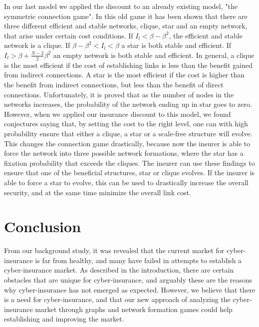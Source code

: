 In our last model we applied the discount to an already existing model, "the symmetric connection game". In this old game it has been shown that there are three different efficient and stable networks, clique, star and an empty network, that arise under certain cost conditions. If $I_{l}<\beta-\beta^{2}$, the efficient and stable network is a clique. If $\beta-\beta^{2}<I_{l}<\beta$ a star is both stable and efficient. If $I_{l}>\beta+\frac{N-2}{2}\beta^{2}$ an empty network is both stable and efficient. In general, a clique is the most efficient if the cost of establishing links is less than the benefit gained from indirect connections. A star is the most efficient if the cost is higher than the benefit from indirect connections, but less than the benefit of direct connections. 
Unfortunately, it is proved that as the number of nodes in the networks increases, the probability of the network ending up in star goes to zero. However, when we applied our insurance discount to this model, we found conjectures saying that, by setting the cost to the right level, one can with high probability ensure that either a clique, a star or a scale-free structure will evolve. This changes the connection game drastically, because now the insurer is able to force the network into three possible network formations, where the star has a fixation probability that exceeds the cliques. The insurer can use these findings to ensure that one of the beneficial structures, star or clique evolves. If the insurer is able to force a star to evolve, this can be used to drastically increase the overall security, and at the same time minimize the overall link cost. 

\section{Conclusion}
From our background study, it was revealed that the current market for cyber-insurance is far from healthy, and many have failed in attempts to establish a cyber-insurance market.
As described in the introduction, there are certain obstacles that are unique for cyber-insurance, and arguably these are the reasons why cyber-insurance has not emerged as expected. 
 However, we believe that there is a need for cyber-insurance, and that our new approach of analyzing the cyber-insurance market through graphs and network formation games could help establishing and improving the market.

